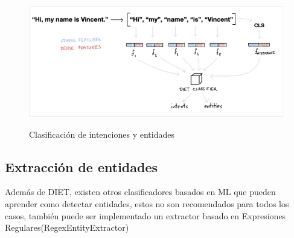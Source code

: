\begin{figure}[h]
    \centering
    \includegraphics[width=\textwidth]{imagenes/cap3/intent_classiffier.png}   
    \caption{Clasificación de intenciones y entidades}
    \label{fig:intentclasification-MLU}
    \cite{Rasa}
\end{figure}



\subsection{Extracción de entidades}

Además de DIET, existen otros clasificadores basados en ML que pueden aprender como detectar entidades, estos no son recomendados para todos los casos, también puede ser implementado un extractor basado en Expresiones
Regulares(RegexEntityExtractor) \cite{warmerdam_2022}

